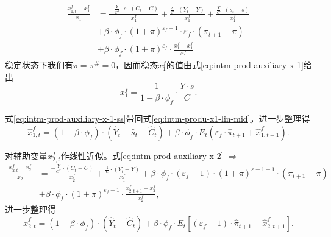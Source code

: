 \begin{equation}
\label{eq:intm-produ-x1-lin-mid}
\begin{split}
\frac{x^f_{1,t} - x^f_1}{x_1} &= \frac{- \frac{Y}{C^2} \cdot s \cdot \left(C_t - C\right)}{x^f_1} + \frac{\frac{s}{C} \cdot \left(Y_t - Y\right)}{x^f_1} + \frac{\frac{Y}{C} \cdot \left(s_t - s\right)}{x^f_1} \\
&+\beta \cdot \phi_f \cdot (1+\pi)^{\varepsilon_f -1} \cdot \varepsilon_f \cdot \left( \pi_{t+1} - \pi \right) \\
&+\beta \cdot \phi_f \cdot \left(1+\pi\right)^{\varepsilon_f} \cdot \frac{x^f_1 - x^f_1}{x^f_{1}}
\end{split}
\end{equation}
稳定状态下我们有$\pi = \pi^{\#} = 0$，因而稳态$x^f_1$的值由式\eqref{eq:intm-prod-auxiliary-x-1}给出
\begin{equation}
\label{eq:intm-prod-auxiliary-x-1-ss}
x^f_1 = \frac{1}{1-\beta \cdot \phi_f} \cdot \frac{Y \cdot s}{C}.
\end{equation}

式\eqref{eq:intm-prod-auxiliary-x-1-ss}带回式\eqref{eq:intm-produ-x1-lin-mid}，进一步整理得
\begin{equation}
\label{eq:intm-prod-auxiliary-x-1-lin-final}
\hat{x}^f_{1,t} = \left(1-\beta \cdot \phi_f \right) \cdot \left(\hat{Y}_t + \hat{s}_t - \hat{C}_t\right) + \beta \cdot \phi_f \cdot E_t \left(\varepsilon_f \cdot \hat{\pi}_{t+1} + \hat{x}^f_{1,t+1}\right).
\end{equation}

对辅助变量$x^f_{2,t}$作线性近似。式\eqref{eq:intm-prod-auxiliary-x-2} $\Rightarrow$
\begin{equation}
\label{eq:intm-produ-x2-lin-mind}
\begin{split}
\frac{x^f_{2,t} - x^f_2}{x_2} &= \frac{- \frac{Y}{C^2} \cdot \left(C_t - C\right)}{x^f_2} + \frac{\frac{1}{C} \cdot \left(Y_t - Y\right)}{x^f_1}
+ \beta \cdot \phi_f \cdot \left(\varepsilon_f -1 \right) \cdot \left(1+\pi\right)^{\varepsilon - 1 - 1} \cdot \left(\pi_{t+1}-\pi\right) \\
&+\beta \cdot \phi_f \cdot (1+\pi)^{\varepsilon_f -1} \cdot \frac{x^f_{2,t+1}-x^f_2}{x^f_2},
\end{split}
\end{equation}
进一步整理得
\begin{equation}
\label{eq:intm-prod-auxiliary-x-2-lin-final}
\hat{x}^f_{2,t} = \left(1-\beta \cdot \phi_f \right) \cdot \left(\hat{Y}_t  - \hat{C}_t\right) + \beta \cdot \phi_f \cdot E_t \left[\left(\varepsilon_f -1\right) \cdot \hat{\pi}_{t+1} + \hat{x}^f_{2,t+1}\right].
\end{equation}

